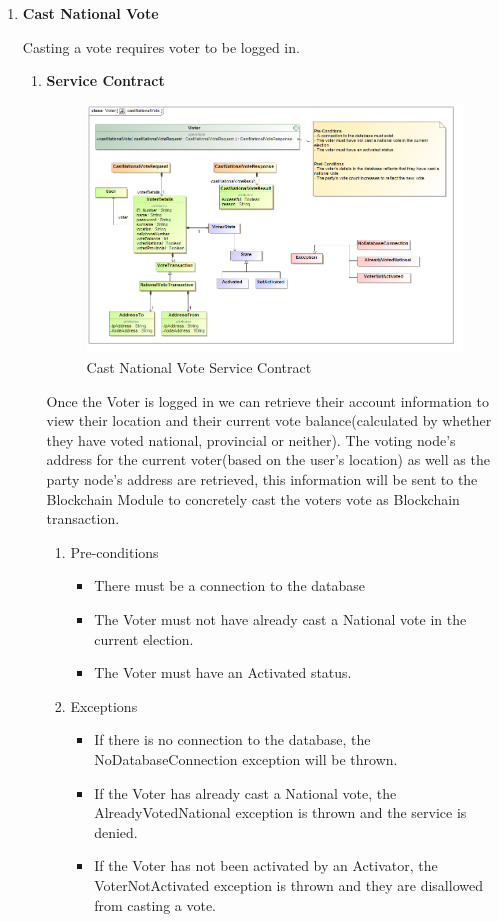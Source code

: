 \begin{enumerate}
	\item \textbf{Cast National Vote}
	
	Casting a vote requires voter to be logged in.
	
	\begin{enumerate}
		\item \textbf{Service Contract}
		\begin{figure}[H]
			\centering
			\includegraphics[width=0.75\linewidth]{../Images/Voter/ServiceContracts/castNationalVote_serviceContract.png}
			\caption{Cast National Vote Service Contract}
		\end{figure}
		
		Once the Voter is logged in we can retrieve their account information to view their location and their current vote balance(calculated by whether they have voted national, provincial or neither). \newline
	 The voting node’s address for the current voter(based on the user’s location) as well as the party node’s address are retrieved, this information will be sent to the Blockchain Module to concretely cast the voters vote as Blockchain transaction.
		\newline				
		
		\begin{enumerate}
			\item Pre-conditions
			\begin{itemize}
				\item There must be a connection to the database
				\item The Voter must not have already cast a National vote in the current election. 
				\item The Voter must have an Activated status.  
			\end{itemize}
			
			\item Exceptions
			\begin{itemize}
				\item If there is no connection to the database, the NoDatabaseConnection exception will be thrown.
				\item If the Voter has already cast a National vote, the AlreadyVotedNational exception is thrown and the service is denied.
				\item If the Voter has not been activated by an Activator, the VoterNotActivated exception is thrown and they are disallowed from casting a vote. 
			\end{itemize}
			

\end{enumerate}
\end{enumerate}
\end{enumerate}
